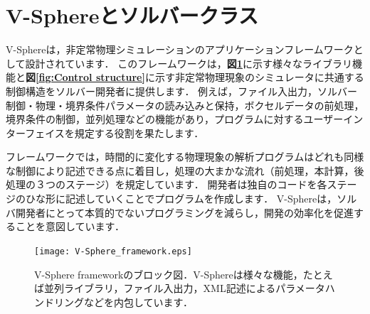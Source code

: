 \graphicspath{{./fig_intro/}}

\section{V-Sphereとソルバークラス}
\label{sec:CBC solver class}

V-Sphereは，非定常物理シミュレーションのアプリケーションフレームワークとして設計されています．
このフレームワークは，\textbf{図\ref{fig:V-Sphere framework}}に示す様々なライブラリ機能と\textbf{図\ref{fig:Control structure}}に示す非定常物理現象のシミュレータに共通する制御構造をソルバー開発者に提供します．
例えば，ファイル入出力，ソルバー制御・物理・境界条件パラメータの読み込みと保持，ボクセルデータの前処理，境界条件の制御，並列処理などの機能があり，プログラムに対するユーザーインターフェイスを規定する役割を果たします．

フレームワークでは，時間的に変化する物理現象の解析プログラムはどれも同様な制御により記述できる点に着目し，処理の大まかな流れ（前処理，本計算，後処理の３つのステージ）を規定しています．
開発者は独自のコードを各ステージのひな形に記述していくことでプログラムを作成します．
V-Sphereは，ソルバ開発者にとって本質的でないプログラミングを減らし，開発の効率化を促進することを意図しています．

\begin{figure}[htbp]
\begin{center}
\texttt{[image: V-Sphere\_framework.eps]}
\end{center}
\caption{V-Sphere frameworkのブロック図．V-Sphereは様々な機能，たとえば並列ライブラリ，ファイル入出力，XML記述によるパラメータハンドリングなどを内包しています．}
\label{fig:V-Sphere framework}
\end{figure}

